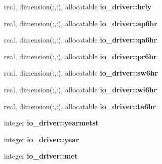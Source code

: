 \begin{DoxyCompactItemize}
\item 
\hypertarget{namespaceio__driver_a17d71f1c9fc6ab958cd0e7d3d2049318}{}real, dimension(\+:,\+:), allocatable {\bfseries io\+\_\+driver\+::hrly}\label{namespaceio__driver_a17d71f1c9fc6ab958cd0e7d3d2049318}

\item 
\hypertarget{namespaceio__driver_a51b6943a89ea1560c9ded84f0931d5a3}{}real, dimension(\+:,\+:), allocatable {\bfseries io\+\_\+driver\+::ap6hr}\label{namespaceio__driver_a51b6943a89ea1560c9ded84f0931d5a3}

\item 
\hypertarget{namespaceio__driver_a7b9958f7e0b7f4746a3392c9ee2a12b0}{}real, dimension(\+:,\+:), allocatable {\bfseries io\+\_\+driver\+::qa6hr}\label{namespaceio__driver_a7b9958f7e0b7f4746a3392c9ee2a12b0}

\item 
\hypertarget{namespaceio__driver_aefe67ef39727a61296b63959f40ef108}{}real, dimension(\+:,\+:), allocatable {\bfseries io\+\_\+driver\+::pr6hr}\label{namespaceio__driver_aefe67ef39727a61296b63959f40ef108}

\item 
\hypertarget{namespaceio__driver_a3907ea87cb9e46159bcd93bf30662269}{}real, dimension(\+:,\+:), allocatable {\bfseries io\+\_\+driver\+::sw6hr}\label{namespaceio__driver_a3907ea87cb9e46159bcd93bf30662269}

\item 
\hypertarget{namespaceio__driver_a23ef62e6105a05c8aa02b0437dd96699}{}real, dimension(\+:,\+:), allocatable {\bfseries io\+\_\+driver\+::wi6hr}\label{namespaceio__driver_a23ef62e6105a05c8aa02b0437dd96699}

\item 
\hypertarget{namespaceio__driver_a5f0debf13a0ecc7226a10b98b9654ef2}{}real, dimension(\+:,\+:), allocatable {\bfseries io\+\_\+driver\+::ta6hr}\label{namespaceio__driver_a5f0debf13a0ecc7226a10b98b9654ef2}

\item 
\hypertarget{namespaceio__driver_a944680f1f7ba8e9412bb787d4c733b8e}{}integer {\bfseries io\+\_\+driver\+::yearmetst}\label{namespaceio__driver_a944680f1f7ba8e9412bb787d4c733b8e}

\item 
\hypertarget{namespaceio__driver_a60ac80c337165b997105079e0dfd760f}{}integer {\bfseries io\+\_\+driver\+::year}\label{namespaceio__driver_a60ac80c337165b997105079e0dfd760f}

\item 
\hypertarget{namespaceio__driver_a1729f82bd75ef619be1d036f9dd7fdcf}{}integer {\bfseries io\+\_\+driver\+::met}\label{namespaceio__driver_a1729f82bd75ef619be1d036f9dd7fdcf}


\end{DoxyCompactItemize}
